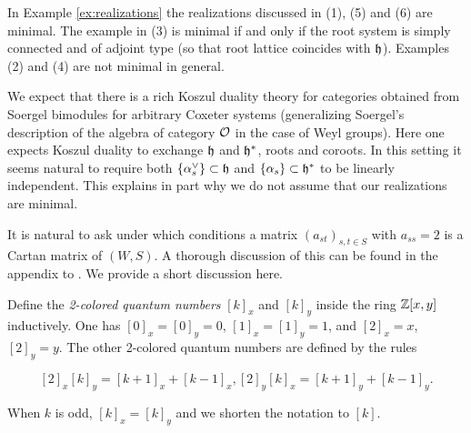 \begin{ex} In Example \ref{ex:realizations} the realizations discussed in (1), (5) and (6) are minimal. The example in (3) is minimal if and only if the root system is simply connected and
of adjoint type (so that root lattice coincides with ${\mathfrak h}$). Examples (2) and (4) are not minimal in general. \end{ex}

\begin{remark} We expect that there is a rich Koszul duality theory for categories obtained from Soergel bimodules for arbitrary Coxeter systems (generalizing Soergel's description
\cite{Soe1} of the algebra of category ${\mathcal{O}}$ in the case of Weyl groups). Here one expects Koszul duality to exchange ${\mathfrak h}$ and ${\mathfrak h}^*$, roots and coroots. In this setting it seems natural
to require both $\{ \alpha_s^{\vee} \} \subset {\mathfrak h}$ and $\{ \alpha_s \} \subset {\mathfrak h}^*$ to be linearly independent. This explains in part why we do not assume that our realizations are
minimal. \end{remark}

It is natural to ask under which conditions a matrix $(a_{st})_{s,t \in S}$ with $a_{ss} = 2$ is a Cartan matrix of $(W,S)$. A thorough discussion of this can be found in the appendix to
\cite{EDihedral}. We provide a short discussion here.

\begin{defn} \label{def:2qnum} Define the \emph{2-colored quantum numbers} $[k]_x$ and $[k]_y$ inside the ring ${\mathbb{Z}}[x,y]$ inductively. One has $[0]_x = [0]_y = 0$, $[1]_x = [1]_y = 1$, and $[2]_x = x$, $[2]_y=y$. The other 2-colored quantum numbers are defined by the rules

\begin{subequations}
\begin{equation} [2]_x [k]_y = [k+1]_x + [k-1]_x, \end{equation}
\begin{equation} [2]_y [k]_x = [k+1]_y + [k-1]_y. \end{equation}
\end{subequations}

When $k$ is odd, $[k]_x = [k]_y$ and we shorten the notation to $[k]$. \end{defn}

